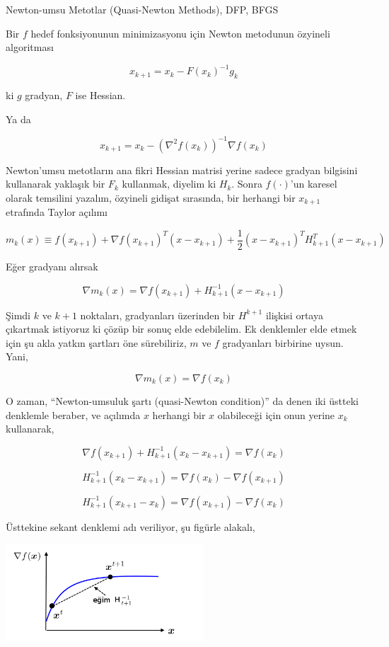\documentclass[12pt,fleqn]{article}\usepackage{../../common}
\begin{document}
Newton-umsu Metotlar (Quasi-Newton Methods), DFP, BFGS 

Bir $f$ hedef fonksiyonunun minimizasyonu için Newton metodunun özyineli 
algoritması

$$
x_{k+1} = x_k - F(x_k)^{-1} g_k
$$

ki $g$ gradyan, $F$ ise Hessian. 

Ya da

$$
x_{k+1} = x_k - (\nabla^2 f(x_k))^{-1} \nabla f(x_k)
$$

Newton'umsu metotların ana fikri Hessian matrisi yerine sadece gradyan
bilgisini kullanarak yaklaşık bir $F_k$ kullanmak, diyelim ki $H_k$. Sonra
$f(\cdot)$'un karesel olarak temsilini yazalım, özyineli gidişat sırasında,
bir herhangi bir $x_{k+1}$ etrafında Taylor açılımı

$$
m_k(x) \equiv f(x_{k+1}) + \nabla f(x_{k+1})^T (x - x_{k+1}) + 
\frac{1}{2} (x - x_{k+1}) ^T H_{k+1}^T (x - x_{k+1}) 
$$

Eğer gradyanı alırsak 

$$
\nabla m_k(x) = \nabla f(x_{k+1}) + H_{k+1}^{-1} (x-x_{k+1})
$$

Şimdi $k$ ve $k+1$ noktaları, gradyanları üzerinden bir $H^{k+1}$ ilişkisi
ortaya çıkartmak istiyoruz ki çözüp bir sonuç elde edebilelim. Ek
denklemler elde etmek için şu akla yatkın şartları öne sürebiliriz, $m$ ve
$f$ gradyanları birbirine uysun. Yani,

$$
\nabla m_k(x) = \nabla f(x_k)
$$

O zaman, ``Newton-umsuluk şartı (quasi-Newton condition)'' da denen iki
üstteki denklemle beraber, ve açılımda $x$ herhangi bir $x$ olabileceği
için onun yerine $x_k$ kullanarak,

$$
\nabla f(x_{k+1}) + H_{k+1}^{-1} (x_k-x_{k+1}) = \nabla f(x_k)
$$

$$
H_{k+1}^{-1} (x_k-x_{k+1}) = \nabla f(x_k) - \nabla f(x_{k+1}) 
$$

$$
H_{k+1}^{-1} (x_{k+1}-x_k) = \nabla f(x_{k+1}) - \nabla f(x_k) 
$$

Üsttekine sekant denklemi adı veriliyor, şu figürle alakalı, 

\includegraphics[width=20em]{func_50_bfgs_01.png}
\end{document}
